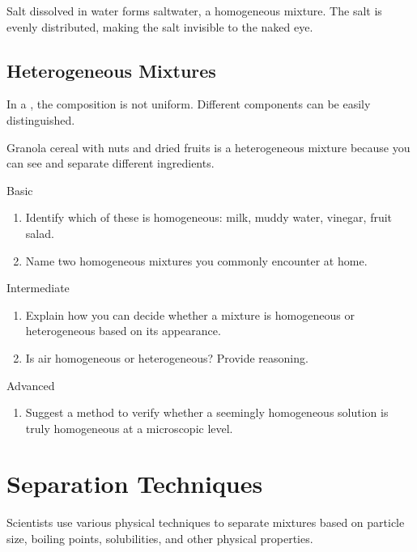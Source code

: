 \begin{example}
Salt dissolved in water forms saltwater, a homogeneous mixture. The salt is evenly distributed, making the salt invisible to the naked eye.
\end{example}

\subsection{Heterogeneous Mixtures}
In a , the composition is not uniform. Different components can be easily distinguished.

\begin{example}
Granola cereal with nuts and dried fruits is a heterogeneous mixture because you can see and separate different ingredients.
\end{example}

\begin{tieredquestions}{Basic}
\begin{enumerate}
    \item Identify which of these is homogeneous: milk, muddy water, vinegar, fruit salad.
    \item Name two homogeneous mixtures you commonly encounter at home.
\end{enumerate}
\end{tieredquestions}

\begin{tieredquestions}{Intermediate}
\begin{enumerate}
    \item Explain how you can decide whether a mixture is homogeneous or heterogeneous based on its appearance.
    \item Is air homogeneous or heterogeneous? Provide reasoning.
\end{enumerate}
\end{tieredquestions}

\begin{tieredquestions}{Advanced}
\begin{enumerate}
    \item Suggest a method to verify whether a seemingly homogeneous solution is truly homogeneous at a microscopic level.
\end{enumerate}
\end{tieredquestions}

\section{Separation Techniques}
Scientists use various physical techniques to separate mixtures based on particle size, boiling points, solubilities, and other physical properties.

